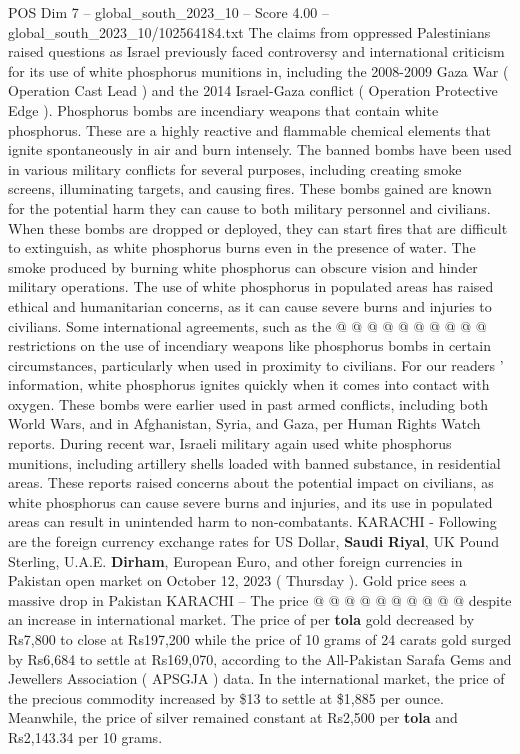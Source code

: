\begin{textsample}{POS Dim 7 – global\_south\_2023\_10 – Score 4.00 – global\_south\_2023\_10/102564184.txt}  \label{ex:f7_pos_137}
The claims from oppressed Palestinians raised questions as Israel previously faced controversy and international criticism for its use of white phosphorus munitions in, including the 2008-2009 Gaza War ( Operation Cast Lead ) and the 2014 Israel-Gaza conflict ( Operation Protective Edge ).
Phosphorus bombs are incendiary weapons that contain white phosphorus.
These are a highly reactive and flammable chemical elements that ignite spontaneously in air and burn intensely.
The banned bombs have been used in various military conflicts for several purposes, including creating smoke screens, illuminating targets, and causing fires.
These bombs gained are known for the potential harm they can cause to both military personnel and civilians.
When these bombs are dropped or deployed, they can start fires that are difficult to extinguish, as white phosphorus burns even in the presence of water.
The smoke produced by burning white phosphorus can obscure vision and hinder military operations.
The use of white phosphorus in populated areas has raised ethical and humanitarian concerns, as it can cause severe burns and injuries to civilians.
Some international agreements, such as the @ @ @ @ @ @ @ @ @ @ restrictions on the use of incendiary weapons like phosphorus bombs in certain circumstances, particularly when used in proximity to civilians.
For our readers ' information, white phosphorus ignites quickly when it comes into contact with oxygen.
These bombs were earlier used in past armed conflicts, including both World Wars, and in Afghanistan, Syria, and Gaza, per Human Rights Watch reports.
During recent war, Israeli military again used white phosphorus munitions, including artillery shells loaded with banned substance, in residential areas.
These reports raised concerns about the potential impact on civilians, as white phosphorus can cause severe burns and injuries, and its use in populated areas can result in unintended harm to non-combatants.
KARACHI - Following are the foreign currency exchange rates for US Dollar, \textbf{Saudi} \textbf{Riyal}, UK Pound Sterling, U.A.E. \textbf{Dirham}, European Euro, and other foreign currencies in Pakistan open market on October 12, 2023 ( Thursday ).
Gold price sees a massive drop in Pakistan KARACHI -- The price @ @ @ @ @ @ @ @ @ @ despite an increase in international market.
The price of per \textbf{tola} gold decreased by Rs7,800 to close at Rs197,200 while the price of 10 grams of 24 carats gold surged by Rs6,684 to settle at Rs169,070, according to the All-Pakistan Sarafa Gems and Jewellers Association ( APSGJA ) data.
In the international market, the price of the precious commodity increased by \$13 to settle at \$1,885 per ounce.
Meanwhile, the price of silver remained constant at Rs2,500 per \textbf{tola} and Rs2,143.34 per 10 grams.

\end{textsample}
